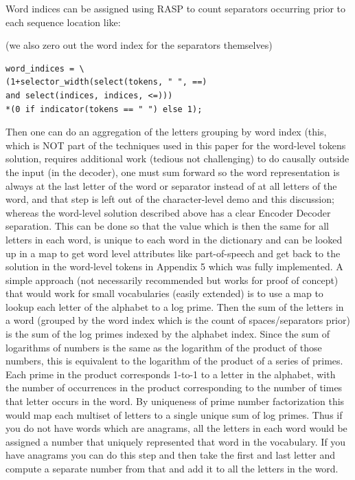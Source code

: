 \documentclass[11pt]{article}
\begin{document}
Word indices can be assigned using RASP to count separators occurring prior to each sequence location like:

(we also zero out the word index for the separators themselves)

\begin{tiny}
\begin{verbatim}
word_indices = \
(1+selector_width(select(tokens, " ", ==) 
and select(indices, indices, <=)))
*(0 if indicator(tokens == " ") else 1);
\end{verbatim}
\end{tiny}

Then one can do an aggregation of the letters grouping by word index (this, which is NOT part of the techniques used in this paper for the word-level tokens solution, requires additional work (tedious not challenging) to do causally outside the input (in the decoder), one must sum forward so the word representation is always at the last letter of the word or separator instead of at all letters of the word, and that step is left out of the character-level demo and this discussion; whereas the word-level solution described above has a clear Encoder Decoder separation. This can be done so that the value which is then the same for all letters in each word, is unique to each word in the dictionary and can be looked up in a map to get word level attributes like part-of-speech and get back to the solution in the word-level tokens in Appendix 5 which was fully implemented. A simple approach (not necessarily recommended but works for proof of concept) that would work for small vocabularies (easily extended) is to use a map to lookup each letter of the alphabet to a log prime. Then the sum of the letters in a word (grouped by the word index which is the count of spaces/separators prior) is the sum of the log primes indexed by the alphabet index. Since the sum of logarithms of numbers is the same as the logarithm of the product of those numbers, this is equivalent to the logarithm of the product of a series of primes. Each prime in the product corresponds 1-to-1 to a letter in the alphabet, with the number of occurrences in the product corresponding to the number of times that letter occurs in the word. By uniqueness of prime number factorization this would map each multiset of letters to a single unique sum of log primes. Thus if you do not have words which are anagrams, all the letters in each word would be assigned a number that uniquely represented that word in the vocabulary. If you have anagrams you can do this step and then take the first and last letter and compute a separate number from that and add it to all the letters in the word.
\end{document}
